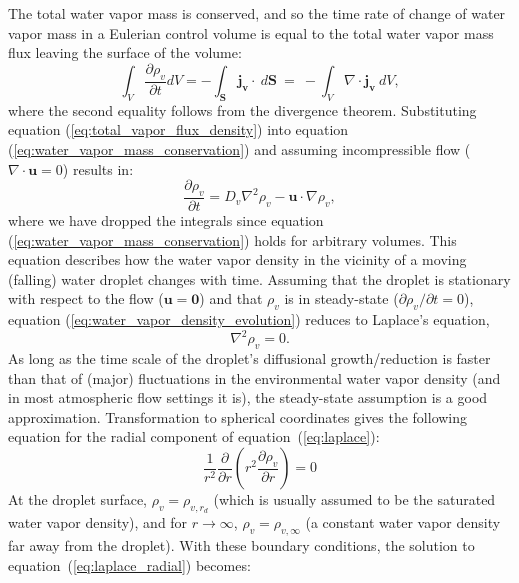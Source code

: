 \documentclass{report}
\begin{document}
The total water vapor mass is conserved, and so the time rate of change of water vapor mass in a Eulerian control volume is equal to the total water vapor mass flux leaving the surface of the volume:
\begin{equation}
    \int_V \frac{\partial \rho_v}{\partial t} dV = - \int_{\mathbf{S}} \mathbf{j_v} \cdot ~d\mathbf{S} ~=~ - \int_V \nabla \cdot \mathbf{j_v} ~dV,
    \label{eq:water_vapor_mass_conservation}
\end{equation}
where the second equality follows from the divergence theorem. Substituting equation (\ref{eq:total_vapor_flux_density}) into equation (\ref{eq:water_vapor_mass_conservation}) and assuming incompressible flow ($\nabla \cdot \mathbf{u} = 0$) results in:
\begin{equation}
    \frac{\partial \rho_v}{\partial t} = D_v \nabla^2 \rho_v - \mathbf{u} \cdot \nabla \rho_v,
    \label{eq:water_vapor_density_evolution}
\end{equation}
where we have dropped the integrals since equation (\ref{eq:water_vapor_mass_conservation}) holds for arbitrary volumes.
This equation describes how the water vapor density in the vicinity of a moving (falling) water droplet changes with time. Assuming that the droplet is stationary with respect to the flow ($\mathbf{u} = \mathbf{0}$) and that $\rho_v$ is in steady-state ($\partial \rho_v / \partial t = 0$), equation (\ref{eq:water_vapor_density_evolution}) reduces to Laplace's equation,
\begin{equation}
    \nabla^2 \rho_v = 0.
    \label{eq:laplace}
\end{equation}
As long as the time scale of the droplet's diffusional growth/reduction is faster than that of (major) fluctuations in the environmental water vapor density (and in most atmospheric flow settings it is), the steady-state assumption is a good approximation. Transformation to spherical coordinates gives the following equation for the radial component of equation~(\ref{eq:laplace}):
\begin{equation}
    \frac{1}{r^2}\frac{\partial}{\partial r} \left(r^2 \frac{\partial \rho_v}{\partial r} \right) = 0
    \label{eq:laplace_radial}
\end{equation}
At the droplet surface, $\rho_v = \rho_{v, r_d}$ (which is usually assumed to be the saturated water vapor density), and for $r \rightarrow \infty$, $\rho_v = \rho_{v, \infty}$ (a constant water vapor density far away from the droplet). With these boundary conditions, the solution to equation~(\ref{eq:laplace_radial}) becomes:
\end{document}
